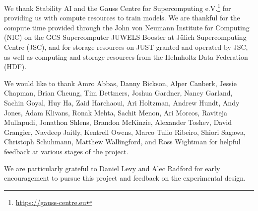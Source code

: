 \documentclass[dvipsnames,11pt]{article}
\begin{document}
We thank Stability AI and the Gauss Centre for Supercomputing e.V.\footnote{\url{https://gauss-centre.eu}} for providing us with compute resources to train models. We are thankful for the compute time provided through the John von Neumann Institute for Computing (NIC) on the GCS Supercomputer JUWELS Booster \citep{JUWELSBooster2020} at Jülich Supercomputing Centre (JSC), and for storage resources on JUST \citep{graf2021just} granted and operated by JSC, as well as computing and storage resources from the Helmholtz Data Federation (HDF).

We would like to thank Amro Abbas, Danny Bickson, Alper Canberk, Jessie Chapman, Brian Cheung, Tim Dettmers, Joshua Gardner, Nancy Garland, Sachin Goyal, Huy Ha, Zaid Harchaoui, Ari Holtzman, Andrew Hundt, Andy Jones, Adam Klivans, Ronak Mehta, Sachit Menon, Ari Morcos, Raviteja Mullapudi, Jonathon Shlens, Brandon McKinzie, Alexander Toshev, David Grangier, Navdeep Jaitly, Kentrell Owens, Marco Tulio Ribeiro, Shiori Sagawa, Christoph Schuhmann, Matthew Wallingford, and Ross Wightman for helpful feedback at various stages of the project.

We are particularly grateful to Daniel Levy and Alec Radford for early encouragement to pursue this project and feedback on the experimental design.

\clearpage



\newpage
\appendix
\onecolumn

\end{document}
